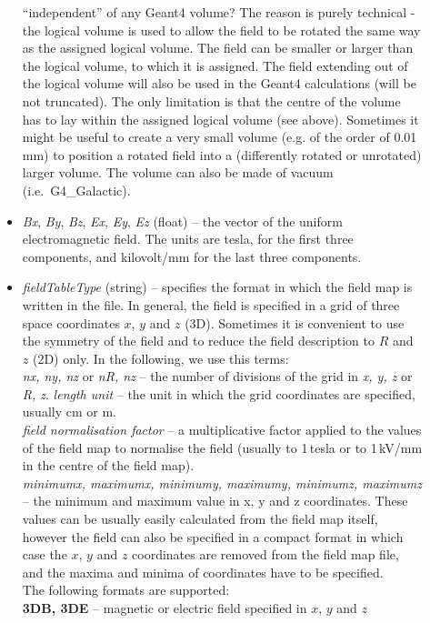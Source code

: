\documentclass[twoside]{dis04}
\begin{document}
\begin{description}
\begin{itemize}
		``independent'' of any Geant4 volume?  The reason is purely technical - the
		logical volume is used to allow the field to be rotated the same way as
		the assigned logical volume. 
		The field can be smaller or larger than the logical
		volume, to which it is assigned.  
		The field extending out of the logical volume will 
		also be used in the Geant4 calculations (will be not truncated).
		The only limitation is that the centre
		of the volume has to lay within the assigned logical volume (see above).
		Sometimes it might be useful to create a very small volume (e.g. of the order of 0.01\,mm)
		to position a rotated field into a (differently rotated or unrotated) 
		larger volume.  The volume can also be made of vacuum (i.e.\ G4\_Galactic).
	   \item \emph{Bx}, \emph{By}, \emph{Bz}, \emph{Ex}, \emph{Ey}, \emph{Ez} (float) -- the vector
		of the uniform electromagnetic field.  The units are tesla, for the first three
		components, and kilovolt/mm for the last three components.
	   \item \emph{fieldTableType} (string) -- specifies the format in which the field map is
		written in the file.  In general, the field is specified in a grid of
		three space coordinates $x$, $y$ and $z$ (3D).
		Sometimes it is convenient to use the symmetry of the field
		and to reduce the field description to $R$ and $z$ (2D) only.  
		In the following, we use this terms: \\
		\emph{nx, ny, nz} or \emph{nR, nz} -- the number of divisions of the grid in
		\emph{x, y, z} or \emph{R, z}.
		\emph{length unit} -- the unit in which the grid coordinates are specified, usually
		cm or m.\\
		\emph{field normalisation factor} -- a multiplicative factor applied to the values
		of the field map to normalise the field (usually to 1\,tesla or to 1\,kV/mm in the
		centre of the field map).\\
		\emph{minimumx, maximumx, minimumy, maximumy, minimumz, maximumz} -- the
		minimum and maximum value in x, y and z coordinates.  These values can be usually easily
		calculated from the field map itself, however the field can also be specified
		in a compact format in which case the $x$, $y$ and $z$ coordinates are removed from
		the field map file,
		and the maxima and minima of coordinates have to be specified.\\
		The following formats are supported:\\
		{\bf 3DB, 3DE} -- magnetic or electric field specified in $x$, $y$ and $z$

\end{itemize}
\end{description}
\end{document}

